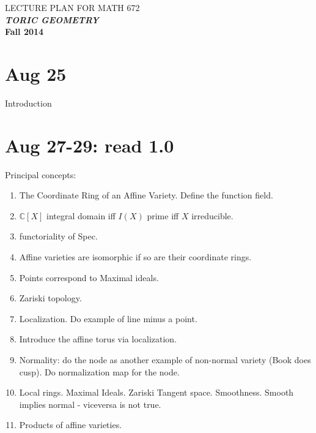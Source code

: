 \documentclass[a4paper,11pt]{article}
\newcommand{\bC}{\mathbb{C}}
\newcommand{\1}{{\rm 1}\!{\rm I}}
\begin{document}
\begin{center}
{LECTURE PLAN FOR MATH 672}\\ \textbf{\textit{TORIC GEOMETRY}}
\\
\textbf{Fall 2014}
\end{center}
\section{Aug 25}
Introduction
\section{Aug 27-29: read 1.0}


Principal concepts:
\begin{enumerate}
\item The Coordinate Ring of an Affine Variety. Define the function field.
\item $\bC[X]$ integral domain iff $I(X)$ prime iff $X$ irreducible.
\item functoriality of Spec.
\item Affine varieties are isomorphic if so are their coordinate rings.
\item Points correspond to Maximal ideals.
\item Zariski topology.
\item Localization. Do example of line minus a point.
\item Introduce the affine torus via localization.
\item Normality: do the node as another example of non-normal variety (Book does cusp). Do normalization map for the node.
\item Local rings. Maximal Ideals. Zariski Tangent space. Smoothness. Smooth implies normal - viceversa is not true.
\item Products of affine varieties.
\end{enumerate}
\end{document}
